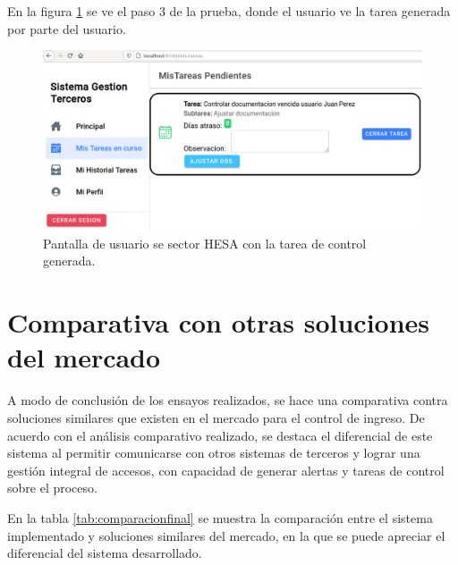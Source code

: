 En la figura \ref{fig:Tarea} se ve el paso 3 de la prueba, donde el usuario ve la tarea generada por parte del usuario.

\begin{figure}[ht]
	\centering
	\includegraphics[width=1\textwidth]{./Figures/tarea.png}
	\caption{Pantalla de usuario se sector HESA con la tarea de control generada.}
	\label{fig:Tarea}
\end{figure}

\clearpage
\section{Comparativa con otras soluciones del mercado}\label{sec:comparativa}

A modo de conclusión de los ensayos realizados, se hace una comparativa contra soluciones similares que existen en el mercado para el control de ingreso. De acuerdo con el análisis comparativo realizado, se destaca el diferencial de este sistema al permitir comunicarse con otros sistemas de terceros y lograr una gestión integral de accesos, con capacidad de generar alertas y tareas de control sobre el proceso.

En la tabla \ref{tab:comparacionfinal} se muestra la comparación entre el sistema implementado y soluciones similares del mercado, en la que se puede apreciar el diferencial del sistema desarrollado.


